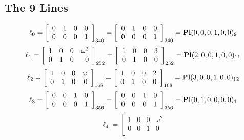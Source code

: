 \documentclass{article}
\begin{document}
{\subsection*{The 9 Lines}
$$
\ell_{0} = 
\left[
\begin{array}{*{4}{r}}
0 & 1 & 0 & 0\\
0 & 0 & 0 & 1\\
\end{array}
\right]
_{340}
=
\left[
\begin{array}{*{4}c}
0  & 1  & 0  & 0\\
0  & 0  & 0  & 1\\
\end{array}
\right]_{340}
={\rm\bf Pl}(0,0,0,1,0,0 )_{9}$$
$$
\ell_{1} = 
\left[
\begin{array}{*{4}{r}}
1 & 0 & 0 & \omega^{2}\\
0 & 1 & 0 & 0\\
\end{array}
\right]
_{252}
=
\left[
\begin{array}{*{4}c}
1  & 0  & 0  & 3\\
0  & 1  & 0  & 0\\
\end{array}
\right]_{252}
={\rm\bf Pl}(2,0,0,1,0,0 )_{11}$$
$$
\ell_{2} = 
\left[
\begin{array}{*{4}{r}}
1 & 0 & 0 & \omega \\
0 & 1 & 0 & 0\\
\end{array}
\right]
_{168}
=
\left[
\begin{array}{*{4}c}
1  & 0  & 0  & 2\\
0  & 1  & 0  & 0\\
\end{array}
\right]_{168}
={\rm\bf Pl}(3,0,0,1,0,0 )_{12}$$
$$
\ell_{3} = 
\left[
\begin{array}{*{4}{r}}
0 & 0 & 1 & 0\\
0 & 0 & 0 & 1\\
\end{array}
\right]
_{356}
=
\left[
\begin{array}{*{4}c}
0  & 0  & 1  & 0\\
0  & 0  & 0  & 1\\
\end{array}
\right]_{356}
={\rm\bf Pl}(0,1,0,0,0,0 )_{1}$$
$$
\ell_{4} = 
\left[
\begin{array}{*{4}{r}}
1 & 0 & 0 & \omega^{2}\\
0 & 0 & 1 & 0\\

\end{array}$$}
\end{document}
